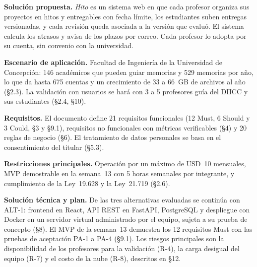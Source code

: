 \documentclass[10pt,a4paper]{article}
\begin{document}
\textbf{Solución propuesta.} \emph{Hito} es un sistema web en que cada profesor organiza sus proyectos en hitos y entregables con fecha límite, los estudiantes suben entregas versionadas, y cada revisión queda asociada a la versión que evaluó. El sistema calcula los atrasos y avisa de los plazos por correo. Cada profesor lo adopta por su cuenta, sin convenio con la universidad.

\textbf{Escenario de aplicación.} Facultad de Ingeniería de la Universidad de Concepción: 146 académicos que pueden guiar memorias y 529 memorias por año, lo que da hasta 675 cuentas y un crecimiento de 33 a 66~GB de archivos al año (§2.3). La validación con usuarios se hará con 3 a 5 profesores guía del DIICC y sus estudiantes (§2.4, §10).

\textbf{Requisitos.} El documento define 21 requisitos funcionales (12 Must, 6 Should y 3 Could, §3 y §9.1), requisitos no funcionales con métricas verificables (§4) y 20 reglas de negocio (§6). El tratamiento de datos personales se basa en el consentimiento del titular (§5.3).

\textbf{Restricciones principales.} Operación por un máximo de USD~10 mensuales, MVP demostrable en la semana~13 con 5 horas semanales por integrante, y cumplimiento de la Ley~19.628 y la Ley~21.719 (§2.6).

\textbf{Solución técnica y plan.} De las tres alternativas evaluadas se continúa con ALT-1: frontend en React, API REST en FastAPI, PostgreSQL y despliegue con Docker en un servidor virtual administrado por el equipo, sujeta a su prueba de concepto (§8). El MVP de la semana~13 demuestra los 12 requisitos Must con las pruebas de aceptación PA-1 a PA-4 (§9.1). Los riesgos principales son la disponibilidad de los profesores para la validación (R-4), la carga desigual del equipo (R-7) y el costo de la nube (R-8), descritos en §12.
\newpage
\end{document}
